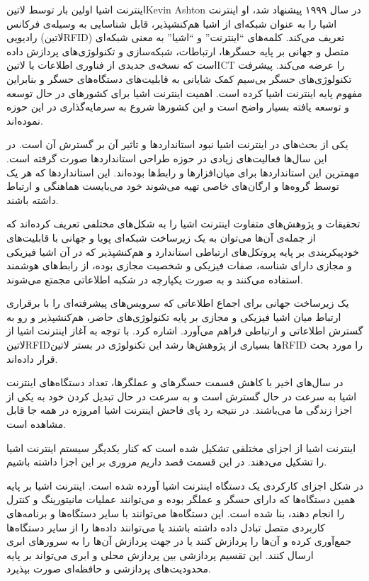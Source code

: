

اینترنت اشیا اولین بار توسط ‌لاتین{Kevin Ashton} در سال ۱۹۹۹ پیشنهاد شد، او اینترنت اشیا را به عنوان
شبکه‌ای از اشیا هم‌کنشپذیر، قابل شناسایی به وسیله‌ی فرکانس رادیویی (‌لاتین{RFID}) تعریف می‌کند.
کلمه‌های ``اینترنت'' و ``اشیا'' به معنی شبکه‌ای متصل و جهانی بر پایه حسگرها، ارتباطات، شبکه‌سازی و تکنولوژی‌های پردازش داده است
که نسخه‌ی جدیدی از فناوری اطلاعات یا ‌لاتین{ICT} را عرضه می‌کند.
پیشرفت تکنولوژی‌های حسگر بی‌سیم کمک شایانی به قابلیت‌های دستگاه‌های حسگر و بنابراین مفهوم پایه اینترنت اشیا کرده است.
اهمیت اینترنت اشیا برای کشورهای در حال توسعه و توسعه یافته بسیار واضح است و این کشورها شروع به سرمایه‌گذاری در این حوزه نموده‌اند.

یکی از بحث‌های در اینترنت اشیا نبود استانداردها و تاثیر آن بر گسترش آن است. در این سال‌ها فعالیت‌های زیادی در حوزه طراحی استانداردها
صورت گرفته است. مهمترین این استانداردها برای میان‌افزارها و رابط‌ها بوده‌اند. این استانداردها که هر یک توسط گروه‌ها و ارگان‌های خاصی تهیه می‌شوند
خود می‌بایست هماهنگی و ارتباط داشته باشند.

تحقیقات و پژوهش‌های متفاوت اینترنت اشیا را به شکل‌های مختلفی تعریف کرده‌اند که از جمله‌ی آن‌ها می‌توان به
یک زیرساخت شبکه‌ای پویا و جهانی با قابلیت‌های خودپیکربندی بر پایه پروتکل‌های ارتباطی استاندارد و هم‌کنشپذیر که در آن اشیا فیزیکی و مجازی دارای شناسه، صفات فیزیکی
و شخصیت مجازی بوده، از رابط‌های هوشمند استفاده می‌کنند و به صورت یکپارچه در شکبه اطلاعاتی مجمتع می‌شوند.

یک زیرساخت جهانی برای اجماع اطلاعاتی که سرویس‌های پیشرفته‌ای را با برقراری ارتباط میان اشیا فیزیکی و مجازی بر پایه تکنولوژی‌های حاضر، هم‌کنشپذیر و رو به گسترش اطلاعاتی
و ارتباطی فراهم می‌آورد.
اشاره کرد. با توجه به آغاز اینترنت اشیا از ‌لاتین{RFID}ها بسیاری از پژوهش‌ها رشد این تکنولوژی در بستر ‌لاتین{RFID} را مورد بحث قرار داده‌اند.

در سال‌های اخیر با کاهش قسمت حسگرهای و عملگرها، تعداد دستگاه‌های اینترنت اشیا به سرعت در حال گسترش است و به سرعت در حال تبدیل کردن خود به یکی از اجزا زندگی ما می‌باشند.
در نتیجه رد پای فاحش اینترنت اشیا امروزه در همه جا قابل مشاهده است.


اینترنت اشیا از اجزای مختلفی تشکیل شده است که کنار یکدیگر سیستم اینترنت اشیا را تشکیل می‌دهند. در این قسمت قصد داریم مروری بر این اجزا داشته باشیم.

در شکل  اجزای کارکردی یک دستگاه اینترنت اشیا آورده شده است.
اینترنت اشیا بر پایه همین دستگاه‌ها که دارای حسگر و عملگر بوده و می‌توانند عملیات مانیتورینگ و کنترل را انجام دهند، بنا شده است.
این دستگاه‌ها می‌توانند با سایر دستگاه‌ها و برنامه‌های کاربردی متصل تبادل داده داشته باشند یا می‌توانند داده‌ها را از سایر دستگاه‌ها جمع‌آوری کرده
و آن‌ها را پردازش کنند یا در جهت پردازش آن‌ها را به سرورهای ابری ارسال کنند. این تقسیم پردازشی بین پردازش محلی و ابری می‌تواند بر پایه محدودیت‌های پردازشی و حافظه‌ای
صورت بپذیرد.

